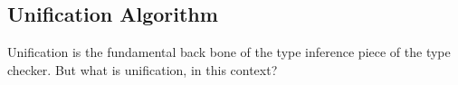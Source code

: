 \documentclass{l4proj}
\begin{document}


    
    
    


\subsection{Unification Algorithm}
\label{sec:design-unification-alg}

Unification is the fundamental back bone of the type inference piece of the type checker.
But what is unification, in this context?
\end{document}
